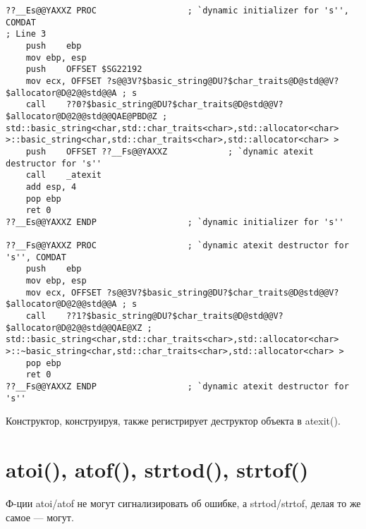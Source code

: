 \begin{lstlisting}[caption=MSVC 2010]
??__Es@@YAXXZ PROC					; `dynamic initializer for 's'', COMDAT
; Line 3
	push	ebp
	mov	ebp, esp
	push	OFFSET $SG22192
	mov	ecx, OFFSET ?s@@3V?$basic_string@DU?$char_traits@D@std@@V?$allocator@D@2@@std@@A ; s
	call	??0?$basic_string@DU?$char_traits@D@std@@V?$allocator@D@2@@std@@QAE@PBD@Z ; std::basic_string<char,std::char_traits<char>,std::allocator<char> >::basic_string<char,std::char_traits<char>,std::allocator<char> >
	push	OFFSET ??__Fs@@YAXXZ			; `dynamic atexit destructor for 's''
	call	_atexit
	add	esp, 4
	pop	ebp
	ret	0
??__Es@@YAXXZ ENDP					; `dynamic initializer for 's''

??__Fs@@YAXXZ PROC					; `dynamic atexit destructor for 's'', COMDAT
	push	ebp
	mov	ebp, esp
	mov	ecx, OFFSET ?s@@3V?$basic_string@DU?$char_traits@D@std@@V?$allocator@D@2@@std@@A ; s
	call	??1?$basic_string@DU?$char_traits@D@std@@V?$allocator@D@2@@std@@QAE@XZ ; std::basic_string<char,std::char_traits<char>,std::allocator<char> >::~basic_string<char,std::char_traits<char>,std::allocator<char> >
	pop	ebp
	ret	0
??__Fs@@YAXXZ ENDP					; `dynamic atexit destructor for 's''
\end{lstlisting}

Конструктор, конструируя, также регистрирует деструктор объекта в atexit().

\section{atoi(), atof(), strtod(), strtof()}

Ф-ции atoi/atof не могут сигнализировать об ошибке, а strtod/strtof, делая то же самое --- могут.




